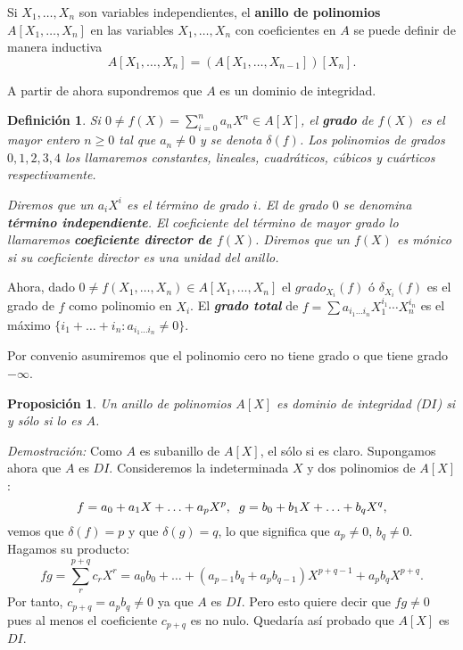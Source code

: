 \documentclass[12pt]{article}
\newtheorem{proposition}[theorem]{Proposición}
\newtheorem{definition}[theorem]{Definición}
\begin{document}
Si $X_1, \ldots, X_n$ son variables independientes, el \textbf{anillo de polinomios} $A[X_1, \ldots, X_n]$ en las variables $X_1, \ldots, X_n$ con coeficientes en $A$ se puede definir de manera inductiva $$A[X_1, \ldots, X_n] = (A[X_1, \ldots, X_{n-1}])[X_n].$$

A partir de ahora supondremos que $A$ es un dominio de integridad.

\begin{definition}Si $0 \neq f(X) = \sum_{i=0}^n a_nX^n \in A[X]$, el \textbf{grado} de $f(X)$ es el mayor entero $n \geq 0$ tal que $a_n \neq 0$ y se denota $\delta (f)$. Los polinomios de grados $0,1,2,3,4$ los llamaremos constantes, lineales, cuadráticos, cúbicos y cuárticos respectivamente.

Diremos que un $a_iX^i$ es el término de grado $i$. El de grado $0$ se denomina \textbf{término independiente}. El coeficiente del término de mayor grado lo llamaremos \textbf{coeficiente director de $f(X)$}. Diremos que un $f(X)$ es mónico si su coeficiente director es una unidad del anillo.
\end{definition}

Ahora, dado $0 \neq f(X_1, \ldots, X_n) \in A[X_1,\ldots, X_n]$ el $grado_{X_i}(f)$ ó $\delta_{X_i}(f)$ es el grado de $f$ como polinomio en $X_i$. El \textbf{\textit{grado total}} de $f = \sum a_{i_1\ldots i_n}X^{i_1}_1\cdots X^{i_n}_n$ es el máximo $\lbrace i_1+\ldots+i_n : a_{i_1 \ldots i_n} \neq 0 \rbrace$.

Por convenio asumiremos que el polinomio cero no tiene grado o que tiene grado $- \infty$.

\begin{proposition} Un anillo de polinomios $A[X]$ es dominio de integridad ($DI$) si y sólo si lo es $A$.
\end{proposition}
\emph{Demostración: }  Como $A$ es subanillo de $A[X]$, el sólo si es claro. Supongamos ahora que $A$ es $DI$. Consideremos la indeterminada $X$ y dos polinomios de $A[X]$: $$f = a_{0} + a_{1}X + \ldots + a_{p}X^{p}, \hspace{0.2cm} g = b_{0} + b_{1}X + \ldots + b_{q}X^{q},$$ vemos que $\delta (f) = p$ y que $\delta (g) = q$, lo que significa que $a_{p} \neq 0$, $b_{q} \neq 0$. Hagamos su producto: $$fg = \sum_{r}^{p+q}c_{r}X^{r} = a_{0}b_{0} + \ldots + (a_{p-1}b_{q} + a_{p}b_{q-1})X^{p+q-1} + a_{p}b_{q}X^{p+q}.$$ Por tanto, $c_{p+q} = a_{p}b_{q} \neq 0$ ya que $A$ es $DI$. Pero esto quiere decir que $fg \neq 0$ pues al menos el coeficiente $c_{p+q}$ es no nulo. Quedaría así probado que $A[X]$ es $DI$.
\end{document}
